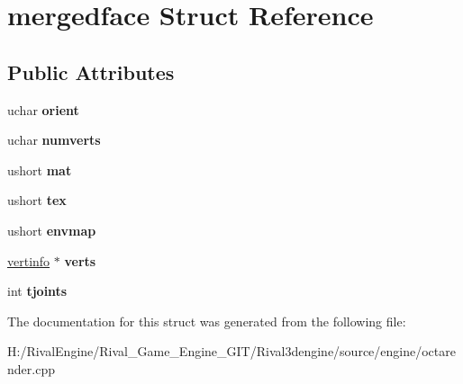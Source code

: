 \hypertarget{structmergedface}{}\section{mergedface Struct Reference}
\label{structmergedface}
\subsection*{Public Attributes}
\begin{DoxyCompactItemize}
\item 
\mbox{\label{structmergedface_a9bb302670d093644a059c26228eb38f3}} 
uchar {\bfseries orient}
\item 
\mbox{\label{structmergedface_a776a78d7dfdbdeffbfa55b4418578f83}} 
uchar {\bfseries numverts}
\item 
\mbox{\label{structmergedface_ac7f189f782df0824366699b8464fb0f4}} 
ushort {\bfseries mat}
\item 
\mbox{\label{structmergedface_a4f93cbb5da9fb66eec37f4ba5fab0261}} 
ushort {\bfseries tex}
\item 
\mbox{\label{structmergedface_a42011d07519e030013dab0eddde8eb6f}} 
ushort {\bfseries envmap}
\item 
\mbox{\label{structmergedface_af5c8fb9d4b10aa7c1be5cef9070b8ca8}} 
\hyperlink{structvertinfo}{vertinfo} $\ast$ {\bfseries verts}
\item 
\mbox{\label{structmergedface_a63cac11ae2e3a7faace927ae7b0f4833}} 
int {\bfseries tjoints}
\end{DoxyCompactItemize}


The documentation for this struct was generated from the following file\+:\begin{DoxyCompactItemize}
\item 
H\+:/\+Rival\+Engine/\+Rival\+\_\+\+Game\+\_\+\+Engine\+\_\+\+G\+I\+T/\+Rival3dengine/source/engine/octarender.\+cpp\end{DoxyCompactItemize}

